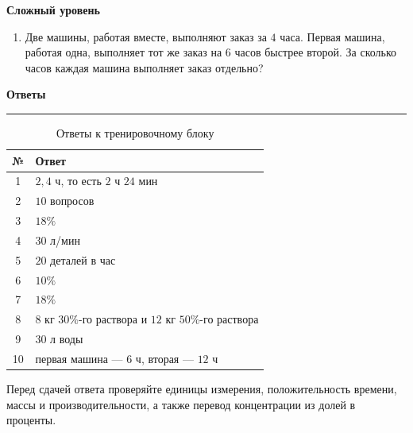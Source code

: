 \documentclass[a4paper,12pt]{article}
\newcommand{\subtopic}[1]{%
    \vspace{0.4em}
    {\large\bfseries\color{darkaccent}#1}\par
    \vspace{0.15em}
}
\begin{document}
\subtopic{Сложный уровень}

\begin{enumerate}[resume]

\item
Две машины, работая вместе, выполняют заказ за $4$ часа.
Первая машина, работая одна, выполняет тот же заказ на $6$ часов быстрее второй.
За сколько часов каждая машина выполняет заказ отдельно?

\end{enumerate}


\newpage
\thispagestyle{fancy}

\begin{center}
{\LARGE\bfseries\color{darkaccent}Ответы}

\vspace{0.25cm}

{\color{accent!55}\rule{0.55\linewidth}{0.7pt}}
\end{center}

\vspace{0.8cm}

\begin{table}[ht]
\centering
\caption{Ответы к тренировочному блоку}
\renewcommand{\arraystretch}{1.45}
\begin{tabularx}{0.82\linewidth}{@{} c X @{}}
\toprule
\textbf{№} & \textbf{Ответ} \\
\midrule

1 &
$2{,}4$ ч, то есть $2$ ч $24$ мин \\

2 &
$10$ вопросов \\

3 &
$18\%$ \\

4 &
$30$ л/мин \\

5 &
$20$ деталей в час \\

6 &
$10\%$ \\

7 &
$18\%$ \\

8 &
$8$ кг $30\%$-го раствора и $12$ кг $50\%$-го раствора \\

9 &
$30$ л воды \\

10 &
первая машина --- $6$ ч, вторая --- $12$ ч \\

\bottomrule
\end{tabularx}
\end{table}

\vfill

\begin{center}
{\small\color{muted}
Перед сдачей ответа проверяйте единицы измерения,
положительность времени, массы и производительности,
а также перевод концентрации из долей в проценты.}
\end{center}
\end{document}
